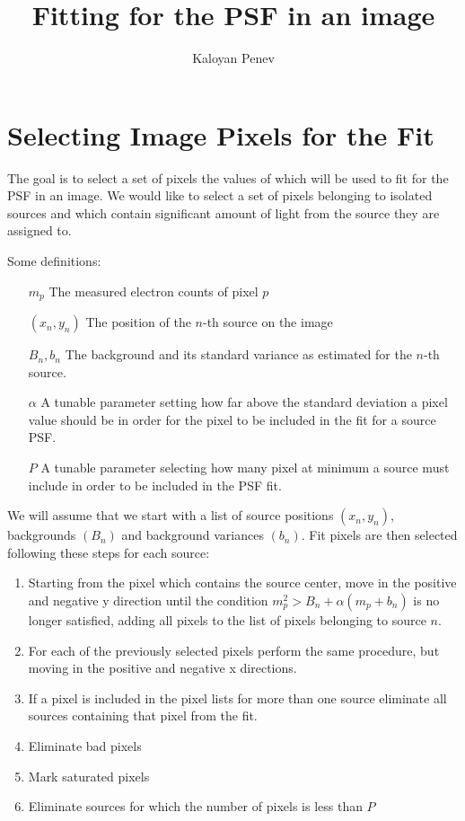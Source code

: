 \documentclass{article}
\author{Kaloyan Penev}
\title{Fitting for the PSF in an image}
\begin{document}
\maketitle
\section{Selecting Image Pixels for the Fit}

The goal is to select a set of pixels the values of which will be used to fit
for the PSF in an image. We would like to select a set of pixels belonging to
isolated sources and which contain significant amount of light from the
source they are assigned to.

Some definitions:
\begin{itemize}
	\item[$m_p$] The measured electron counts of pixel $p$
	\item[$(x_n,y_n)$] The position of the $n$-th source on the image
	\item[$B_n, b_n$] The background and its standard variance as estimated
		for the $n$-th source.
	\item[$\alpha$] A tunable parameter setting how far above the standard
		deviation a pixel value should be in order for the pixel to be
		included in the fit for a source PSF.
	\item[$P$] A tunable parameter selecting how many pixel at minimum a
		source must include in order to be included in the PSF fit.
\end{itemize}

We will assume that we start with a list of source positions $(x_n, y_n)$,
backgrounds $(B_n)$ and background variances $(b_n)$. Fit pixels are then
selected following these steps for each source:

\begin{enumerate}
	\item Starting from the pixel which contains the source center, move in
		the positive and negative y direction until the condition
		$m_p^2>B_n+\alpha\left(m_p+b_n\right)$ is no longer satisfied, adding all
		pixels to the list of pixels belonging to source $n$.
	\item For each of the previously selected pixels perform the same
		procedure, but moving in the positive and negative x directions.
	\item If a pixel is included in the pixel lists for more than one source
		eliminate all sources containing that pixel from the fit.
	\item Eliminate bad pixels
	\item Mark saturated pixels
	\item Eliminate sources for which the number of pixels is less than $P$
\end{enumerate}
\end{document}
